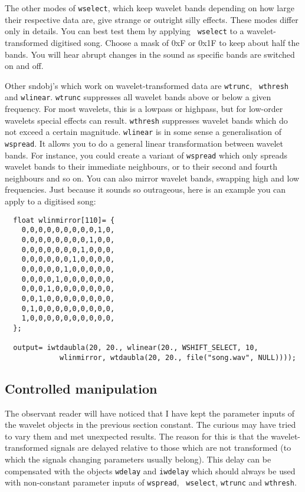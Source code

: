 \documentclass{article}
\def\bv{\begin{verbatim}}
\begin{document}
The other modes of {\tt wselect}, which keep wavelet bands depending on how
large their respective data are, give strange or outright silly effects.  These
modes differ only in details.  You can best test them by applying {\tt
wselect} to a wavelet-transformed digitised song.  Choose a mask of 0xF or 0x1F
to keep about half the bands.  You will hear abrupt changes in the sound as
specific bands are switched on and off.

Other sndobj's which work on wavelet-transformed data are {\tt wtrunc}, {\tt
wthresh} and {\tt wlinear}.  {\tt wtrunc} suppresses all wavelet bands above or
below a given frequency.  For most wavelets, this is a lowpass or highpass, but
for low-order wavelets special effects can result.  {\tt wthresh} suppresses
wavelet bands which do not exceed a certain magnitude.  {\tt wlinear} is in
some sense a generalisation of {\tt wspread}.  It allows you to do a general
linear transformation between wavelet bands.  For instance, you could create a
variant of {\tt wspread} which only spreads wavelet bands to their immediate
neighbours, or to their second and fourth neighbours and so on.  You can also
mirror wavelet bands, swapping high and low frequencies.  Just because it
sounds so outrageous, here is an example you can apply to a digitised song:

\bv
  float wlinmirror[110]= {
    0,0,0,0,0,0,0,0,0,1,0, 
    0,0,0,0,0,0,0,0,1,0,0,
    0,0,0,0,0,0,0,1,0,0,0,
    0,0,0,0,0,0,1,0,0,0,0,
    0,0,0,0,0,1,0,0,0,0,0,
    0,0,0,0,1,0,0,0,0,0,0,
    0,0,0,1,0,0,0,0,0,0,0,
    0,0,1,0,0,0,0,0,0,0,0,
    0,1,0,0,0,0,0,0,0,0,0,
    1,0,0,0,0,0,0,0,0,0,0,
  };

  output= iwtdaubla(20, 20., wlinear(20., WSHIFT_SELECT, 10, 
             wlinmirror, wtdaubla(20, 20., file("song.wav", NULL))));
\end{verbatim}


\subsection{Controlled manipulation}

The observant reader will have noticed that I have kept the parameter inputs of
the wavelet objects in the previous section constant.  The curious may have
tried to vary them and met unexpected results.  The reason for this is that the
wavelet-transformed signals are delayed relative to those which are not
transformed (to which the signals changing parameters usually belong).  This
delay can be compensated with the objects {\tt wdelay} and {\tt iwdelay} which
should always be used with non-constant parameter inputs of {\tt wspread}, {\tt
wselect}, {\tt wtrunc} and {\tt wthresh}.
\end{document}
